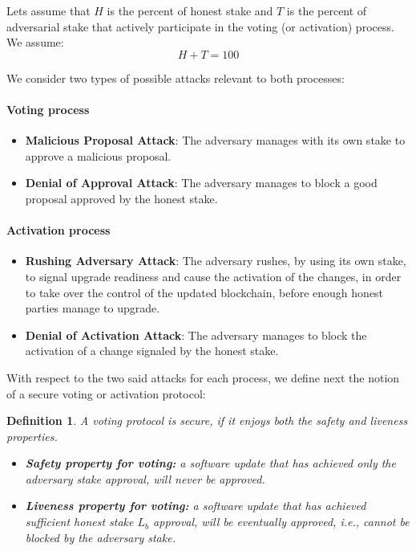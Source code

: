 \documentclass[11pt,a4paper]{article}
\newtheorem{definition}{Definition}
\begin{document}
Lets assume that $H$ is the percent of honest stake and $T$ is the percent of
adversarial stake that actively participate in the voting (or activation)
process. We assume:
\begin{equation}\label{eq:H_plus_T}
	H+T=100
\end{equation}

We consider two types of possible attacks relevant to both processes:
\paragraph{Voting process}
\begin{itemize}
\item \textbf{Malicious Proposal Attack}: The adversary manages with its own
  stake to approve a malicious proposal.
\item \textbf{Denial of Approval Attack}: The adversary manages to block a good
  proposal approved by the honest stake.
\end{itemize}

\paragraph{Activation process}
\begin{itemize}
\item \textbf{Rushing Adversary Attack}: The adversary rushes, by using its own
  stake, to signal upgrade readiness and cause the activation of the changes, in
  order to take over the control of the updated blockchain, before enough honest
  parties manage to upgrade.
\item \textbf{Denial of Activation Attack}: The adversary manages to block the
  activation of a change signaled by the honest stake.
\end{itemize}

With respect to the two said attacks for each process, we define next the notion
of a secure voting or activation protocol:
\begin{definition}\label{def:liveness_safety_voting}
	A voting protocol is secure, if it enjoys both the safety and liveness
  properties.

	\begin{itemize}
  \item \textbf{Safety property for voting:} a software update that has achieved
    only the adversary stake approval, will never be approved.

  \item \textbf{Liveness property for voting:} a software update that has
    achieved sufficient honest stake $L_b$ approval, will be eventually
    approved, i.e., cannot be blocked by the adversary stake.
	\end{itemize}
\end{definition}
\end{document}
